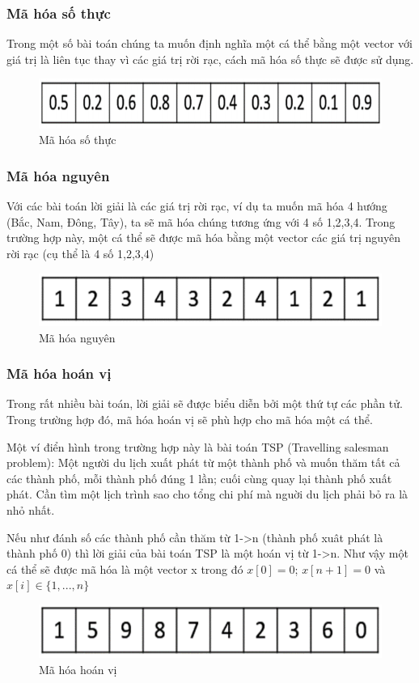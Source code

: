 \documentclass[a4paper,12pt]{report}
\begin{document}
\subsubsection{Mã hóa số thực}
Trong một số bài toán chúng ta muốn định nghĩa một cá thể bằng một vector với giá trị là liên tục thay vì các giá trị rời rạc, cách mã hóa số thực sẽ được sử dụng.
\begin{figure}[H]
\centering 
\includegraphics[scale=0.6]{real_representation.PNG}
\caption{Mã hóa số thực}
\end{figure}

\subsubsection{Mã hóa nguyên}
Với các bài toán lời giải là các giá trị rời rạc, ví dụ ta muốn mã hóa 4 hướng (Bắc, Nam, Đông, Tây), ta sẽ mã hóa chúng tương ứng với 4 số {1,2,3,4}. Trong trường hợp này, một cá thể sẽ được mã hóa bằng một vector các giá trị nguyên rời rạc (cụ thể là 4 số {1,2,3,4})
\begin{figure}[H]
\centering 
\includegraphics[scale=0.6]{integer_representation.PNG}
\caption{Mã hóa nguyên}
\end{figure}

\subsubsection{Mã hóa hoán vị}
Trong rất nhiều bài toán, lời giải sẽ được biểu diễn bởi một thứ tự các phần tử. Trong trường hợp đó, mã hóa hoán vị sẽ phù hợp cho mã hóa một cá thể.
\par Một ví điển hình trong trường hợp này là bài toán TSP (Travelling salesman problem): Một người du lịch xuất phát từ một thành phố và muốn thăm tất cả các thành phố, mỗi thành phố đúng 1 lần; cuối cùng quay lại thành phố xuất phát. Cần tìm một lịch trình sao cho tổng chi phí mà nguời du lịch phải bỏ ra là nhỏ nhất.
\par Nếu như đánh số các thành phố cần thăm từ 1->n (thành phố xuât phát là thành phố 0) thì lời giải của bài toán TSP là một hoán vị từ 1->n. Như vậy một cá thể sẽ được mã hóa là một vector x trong đó $x[0] = 0$; $x[n+1] = 0$ và $x[i] \in \{1,...,n\}$ 
\begin{figure}[H]
\centering
\includegraphics[scale=0.6]{permutation_representation.PNG}
\caption{Mã hóa hoán vị}
\end{figure}
\end{document}
